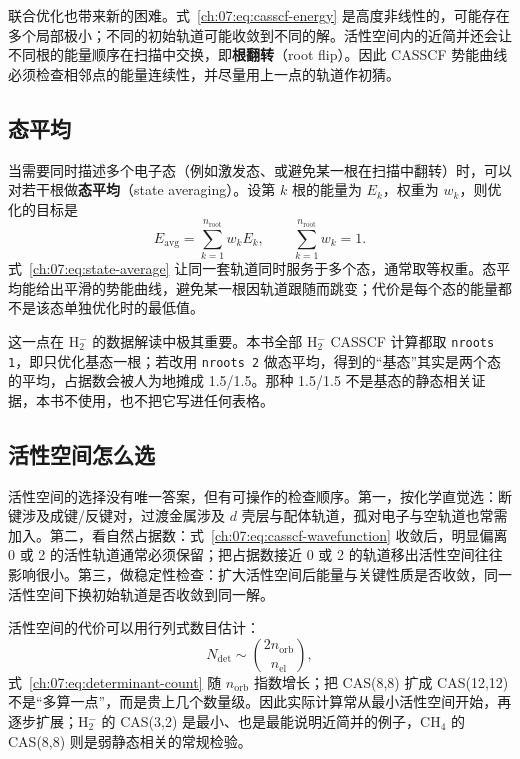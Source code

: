 联合优化也带来新的困难。式~\eqref{ch:07:eq:casscf-energy} 是高度非线性的，可能存在多个局部极小；不同的初始轨道可能收敛到不同的解。活性空间内的近简并还会让不同根的能量顺序在扫描中交换，即\textbf{根翻转}（root flip）。因此 CASSCF 势能曲线必须检查相邻点的能量连续性，并尽量用上一点的轨道作初猜。

\subsection{态平均}
\label{ch:07:sec:state-average}

当需要同时描述多个电子态（例如激发态、或避免某一根在扫描中翻转）时，可以对若干根做\textbf{态平均}（state averaging）。设第 $k$ 根的能量为 $E_k$，权重为 $w_k$，则优化的目标是
\begin{equation}
E_{\mathrm{avg}}=\sum_{k=1}^{n_{\mathrm{root}}} w_k E_k,
\qquad
\sum_{k=1}^{n_{\mathrm{root}}} w_k=1 .
\label{ch:07:eq:state-average}
\end{equation}
式~\eqref{ch:07:eq:state-average} 让同一套轨道同时服务于多个态，通常取等权重。态平均能给出平滑的势能曲线，避免某一根因轨道跟随而跳变；代价是每个态的能量都不是该态单独优化时的最低值。

这一点在 H$_2^-$ 的数据解读中极其重要。本书全部 H$_2^-$ CASSCF 计算都取 \texttt{nroots 1}，即只优化基态一根；若改用 \texttt{nroots 2} 做态平均，得到的“基态”其实是两个态的平均，占据数会被人为地摊成 1.5/1.5。那种 1.5/1.5 不是基态的静态相关证据，本书不使用，也不把它写进任何表格。

\subsection{活性空间怎么选}
\label{ch:07:sec:active-choice}

活性空间的选择没有唯一答案，但有可操作的检查顺序。第一，按化学直觉选：断键涉及成键/反键对，过渡金属涉及 $d$ 壳层与配体轨道，孤对电子与空轨道也常需加入。第二，看自然占据数：式~\eqref{ch:07:eq:casscf-wavefunction} 收敛后，明显偏离 0 或 2 的活性轨道通常必须保留；把占据数接近 0 或 2 的轨道移出活性空间往往影响很小。第三，做稳定性检查：扩大活性空间后能量与关键性质是否收敛，同一活性空间下换初始轨道是否收敛到同一解。

活性空间的代价可以用行列式数目估计：
\begin{equation}
N_{\det}\sim\binom{2n_{\mathrm{orb}}}{n_{\mathrm{el}}},
\label{ch:07:eq:determinant-count}
\end{equation}
式~\eqref{ch:07:eq:determinant-count} 随 $n_{\mathrm{orb}}$ 指数增长；把 CAS(8,8) 扩成 CAS(12,12) 不是“多算一点”，而是贵上几个数量级。因此实际计算常从最小活性空间开始，再逐步扩展；H$_2^-$ 的 CAS(3,2) 是最小、也是最能说明近简并的例子，CH$_4$ 的 CAS(8,8) 则是弱静态相关的常规检验。

